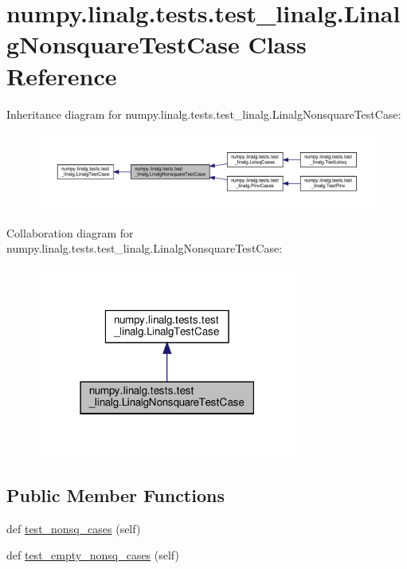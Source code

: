 \hypertarget{classnumpy_1_1linalg_1_1tests_1_1test__linalg_1_1LinalgNonsquareTestCase}{}\section{numpy.\+linalg.\+tests.\+test\+\_\+linalg.\+Linalg\+Nonsquare\+Test\+Case Class Reference}
\label{classnumpy_1_1linalg_1_1tests_1_1test__linalg_1_1LinalgNonsquareTestCase}


Inheritance diagram for numpy.\+linalg.\+tests.\+test\+\_\+linalg.\+Linalg\+Nonsquare\+Test\+Case\+:
\nopagebreak
\begin{figure}[H]
\begin{center}
\leavevmode
\includegraphics[width=350pt]{classnumpy_1_1linalg_1_1tests_1_1test__linalg_1_1LinalgNonsquareTestCase__inherit__graph}
\end{center}
\end{figure}


Collaboration diagram for numpy.\+linalg.\+tests.\+test\+\_\+linalg.\+Linalg\+Nonsquare\+Test\+Case\+:
\nopagebreak
\begin{figure}[H]
\begin{center}
\leavevmode
\includegraphics[width=243pt]{classnumpy_1_1linalg_1_1tests_1_1test__linalg_1_1LinalgNonsquareTestCase__coll__graph}
\end{center}
\end{figure}
\subsection*{Public Member Functions}
\begin{DoxyCompactItemize}
\item 
def \hyperlink{classnumpy_1_1linalg_1_1tests_1_1test__linalg_1_1LinalgNonsquareTestCase_a5560719f83b115c5bbd43bbb0f6e3e8c}{test\+\_\+nonsq\+\_\+cases} (self)
\item 
def \hyperlink{classnumpy_1_1linalg_1_1tests_1_1test__linalg_1_1LinalgNonsquareTestCase_a3dfabae137bf29120353fc1cfaa7530f}{test\+\_\+empty\+\_\+nonsq\+\_\+cases} (self)
\end{DoxyCompactItemize}
